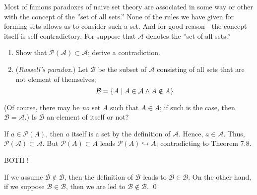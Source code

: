 \documentclass[a4paper,12pt]{article}
\begin{document}
\begin{exe}
	Most of famous paradoxes of naive set theory are associated in some way or other with the concept of the ''set of all sets.''
	None of the rules we have given for forming sets allows us to consider such a set.
	And for good reason---the concept itself is self-contradictory.
	For suppose that \( \mathcal{A} \) denotes the ''set of all sets.''
	\begin{enumerate}
		\item
		      Show that \( \mathcal{P}(\mathcal{A}) \subset \mathcal{A} \);
		      derive a contradiction.
		      
		\item
		      (\textit{Russell's paradox.})
		      Let \( \mathcal{B} \) be the subset of \( \mathcal{A} \) consisting of all sets that are not element of themselves;
		      \begin{equation*}
			      \mathcal{B} = \left\{ A \;|\; A \in \mathcal{A}\wedge A \notin A \right\}
		      \end{equation*}
	\end{enumerate}
	(Of course, there may be \textit{no} set \( A \) such that \( A\in A \);
	if such is the case, then \( \mathcal{B} = \mathcal{A}\).)
	Is \( \mathcal{B} \) an element of itself or not?
\end{exe}
\begin{sol}\leavevmode \par
	If
	\( a \in \mathcal{P}(A) \),
	then \( a \) itself is a set by the definition of \( \mathcal{A} \).
	Hence, \( a \in \mathcal{A} \).
	Thus, \( \mathcal{P}(\mathcal{A}) \subset \mathcal{A} \).
	But
	\( \mathcal{P}(A) \subset A\)
	leads
	\( \mathcal{P}(A) \hookrightarrow A\),
	contradicting to Theorem 7.8.
	
	BOTH !
	
	If we assume \( \mathcal{B} \notin \mathcal{B} \),
	then the definition of
	\( \mathcal{B} \)
	leads to
	\( \mathcal{B}\in \mathcal{B} \).
	On the other hand, if we suppose \( \mathcal{B} \in \mathcal{B} \),
	then we are led to \( \mathcal{B} \notin \mathcal{B} \).
	\qed\end{sol}
\end{document}
